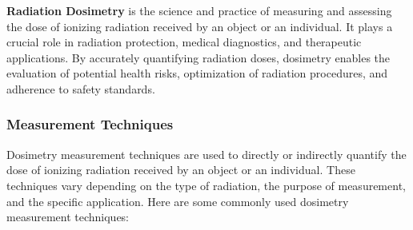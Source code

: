 \documentclass[../introduction.tex]{subfiles}
\begin{document}
    \textbf{Radiation Dosimetry}\cite{b4} is the science and practice of measuring and assessing the dose of ionizing 
    radiation received by an object or an individual. It plays a crucial role in radiation protection, medical 
    diagnostics, and therapeutic applications. By accurately quantifying radiation doses, dosimetry enables the 
    evaluation of potential health risks, optimization of radiation procedures, and adherence to safety standards.

    \subsubsection*{\large Measurement Techniques}
        Dosimetry measurement techniques\cite{b6} are used to directly or indirectly quantify the dose of ionizing radiation 
        received by an object or an individual. These techniques vary depending on the type of radiation, the purpose 
        of measurement, and the specific application. Here are some commonly used dosimetry measurement techniques:
\end{document}
